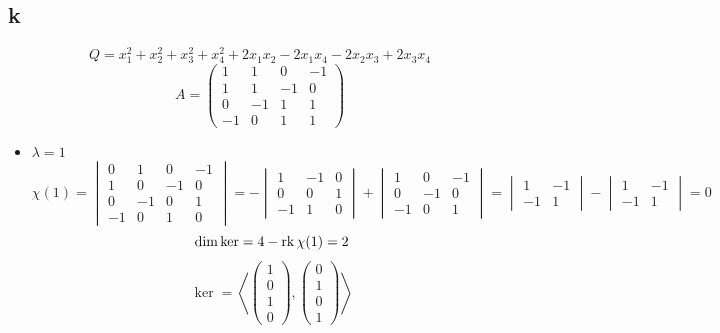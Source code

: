\subsection{k}

$$ Q = x_1^2 + x_2^2 + x_3^2 + x_4^2 + 2x_1x_2 - 2x_1x_4 - 2x_2x_3 + 2x_3x_4 $$
$$ A =
\begin{pmatrix}
	1 & 1 & 0 & -1 \\
    1 & 1 & -1 & 0 \\
    0 & -1 & 1 & 1 \\
    -1 & 0 & 1 & 1
\end{pmatrix} $$
\begin{itemize}
	\item $ \lambda = 1 $
    $$ \chi(1) =
    \begin{vmatrix}
        0 & 1 & 0 & -1 \\
        1 & 0 & -1 & 0 \\
        0 & -1 & 0 & 1 \\
        -1 & 0 & 1 & 0
    \end{vmatrix} = -
    \begin{vmatrix}
        1 & -1 & 0 \\
        0 & 0 & 1 \\
        -1 & 1 & 0
    \end{vmatrix} +
    \begin{vmatrix}
        1 & 0 & -1 \\
        0 & -1 & 0 \\
        -1 & 0 & 1
    \end{vmatrix} =
    \begin{vmatrix}
        1 & -1 \\
        -1 & 1
    \end{vmatrix} -
    \begin{vmatrix}
        1 & -1 \\
        -1 & 1
    \end{vmatrix} = 0 $$
    $$ \dim \ker = 4 - \operatorname{rk} \chi(1) = 2 $$
    $$ \ker = \left\langle
    \begin{pmatrix}
    	1 \\
        0 \\
        1 \\
        0
    \end{pmatrix},
    \begin{pmatrix}
    	0 \\
        1 \\
        0 \\
        1
    \end{pmatrix} \right\rangle $$

\end{itemize}
